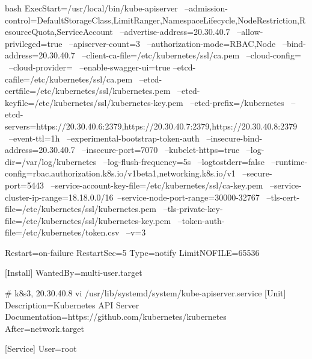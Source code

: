 \begin{outline}[enumerate]
\begin{code-block}{bash}
ExecStart=/usr/local/bin/kube-apiserver \
    --admission-control=DefaultStorageClass,LimitRanger,NamespaceLifecycle,NodeRestriction,ResourceQuota,ServiceAccount \
    --advertise-address=20.30.40.7 \
    --allow-privileged=true \
    --apiserver-count=3 \
    --authorization-mode=RBAC,Node \
    --bind-address=20.30.40.7 \
    --client-ca-file=/etc/kubernetes/ssl/ca.pem \
    --cloud-config= \
    --cloud-provider= \
    --enable-swagger-ui=true --etcd-cafile=/etc/kubernetes/ssl/ca.pem \
    --etcd-certfile=/etc/kubernetes/ssl/kubernetes.pem \
    --etcd-keyfile=/etc/kubernetes/ssl/kubernetes-key.pem \
    --etcd-prefix=/kubernetes \
    --etcd-servers=https://20.30.40.6:2379,https://20.30.40.7:2379,https://20.30.40.8:2379 \
    --event-ttl=1h \
    --experimental-bootstrap-token-auth \
    --insecure-bind-address=20.30.40.7 \
    --insecure-port=7070 \
    --kubelet-https=true \
    --log-dir=/var/log/kubernetes \
    --log-flush-frequency=5s \
    --logtostderr=false \
    --runtime-config=rbac.authorization.k8s.io/v1beta1,networking.k8s.io/v1 \
    --secure-port=5443 \
    --service-account-key-file=/etc/kubernetes/ssl/ca-key.pem \
    --service-cluster-ip-range=18.18.0.0/16\
    --service-node-port-range=30000-32767 \
    --tls-cert-file=/etc/kubernetes/ssl/kubernetes.pem \
    --tls-private-key-file=/etc/kubernetes/ssl/kubernetes-key.pem \
    --token-auth-file=/etc/kubernetes/token.csv \
    --v=3

Restart=on-failure
RestartSec=5
Type=notify
LimitNOFILE=65536

[Install]
WantedBy=multi-user.target

# k8s3, 20.30.40.8
vi /usr/lib/systemd/system/kube-apiserver.service
[Unit]
Description=Kubernetes API Server
Documentation=https://github.com/kubernetes/kubernetes
After=network.target

[Service]
User=root


\end{code-block}
\end{outline}
